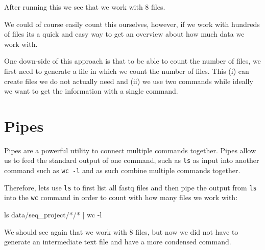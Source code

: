 \documentclass[
  letterpaper,
  DIV=11,
  numbers=noendperiod]{scrreprt}
\newenvironment{Shaded}{}{}
\newcommand{\AttributeTok}[1]{\textcolor[rgb]{0.84,0.23,0.29}{#1}}
\newcommand{\FunctionTok}[1]{\textcolor[rgb]{0.44,0.26,0.76}{#1}}
\newcommand{\KeywordTok}[1]{\textcolor[rgb]{0.84,0.23,0.29}{#1}}
\newcommand{\NormalTok}[1]{\textcolor[rgb]{0.14,0.16,0.18}{#1}}
\newcommand{\PreprocessorTok}[1]{\textcolor[rgb]{0.84,0.23,0.29}{#1}}
\begin{document}
After running this we see that we work with 8 files.

We could of course easily count this ourselves, however, if we work with
hundreds of files its a quick and easy way to get an overview about how
much data we work with.

One down-side of this approach is that to be able to count the number of
files, we first need to generate a file in which we count the number of
files. This (i) can create files we do not actually need and (ii) we use
two commands while ideally we want to get the information with a single
command.

\section{Pipes}\label{pipes}

Pipes are a powerful utility to connect multiple commands together.
Pipes allow us to feed the standard output of one command, such as
\texttt{ls} as input into another command such as \texttt{wc\ -l} and as
such combine multiple commands together.

Therefore, lets use \texttt{ls} to first list all fastq files and then
pipe the output from \texttt{ls} into the \texttt{wc} command in order
to count with how many files we work with:

\begin{Shaded}
\begin{Highlighting}[]
\FunctionTok{ls}\NormalTok{ data/seq\_project/}\PreprocessorTok{*}\NormalTok{/}\PreprocessorTok{*} \KeywordTok{|} \FunctionTok{wc} \AttributeTok{{-}l}
\end{Highlighting}
\end{Shaded}

We should see again that we work with 8 files, but now we did not have
to generate an intermediate text file and have a more condensed command.
\end{document}
